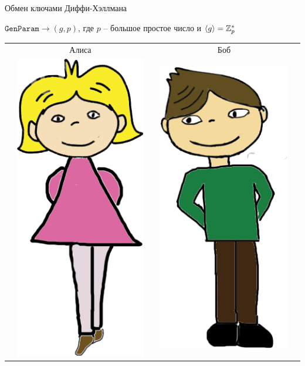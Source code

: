 \documentclass[usenames,dvipsnames,8pt,aspectratio=169]{beamer}
\begin{document}
\begin{frame}{Обмен ключами Диффи-Хэллмана}
\Large
\begin{center}
$\mathtt{GenParam} \rightarrow (g, p)$, где $p$ -- большое простое число и $\langle g \rangle = {{\mathbb Z}}_p^\ast$
\large 
\begin{center}
\begin{tabular}{l c c c l}
	& Алиса  & & Боб &  \\
	& \multirow{5}{*}{\includegraphics[scale=0.15]{Alice}} & & 
	\multirow{5}{*}{\includegraphics[scale=0.15]{Bob}} &    \\

\end{tabular}
\end{center}
\end{center}
\end{frame}
\end{document}
